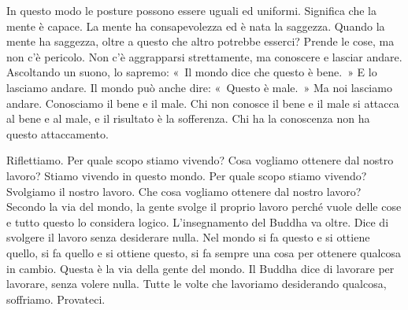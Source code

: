 In questo modo le posture possono essere uguali ed uniformi. Significa
che la mente è capace. La mente ha consapevolezza ed è nata la saggezza.
Quando la mente ha saggezza, oltre a questo che altro potrebbe esserci?
Prende le cose, ma non c'è pericolo. Non c'è aggrapparsi strettamente,
ma conoscere e lasciar andare. Ascoltando un suono, lo sapremo: «~Il
mondo dice che questo è bene.~» E lo lasciamo andare. Il mondo può anche
dire: «~Questo è male.~» Ma noi lasciamo andare. Conosciamo il bene e il
male. Chi non conosce il bene e il male si attacca al bene e al male, e
il risultato è la sofferenza. Chi ha la conoscenza non ha questo
attaccamento.

Riflettiamo. Per quale scopo stiamo vivendo? Cosa vogliamo ottenere dal
nostro lavoro? Stiamo vivendo in questo mondo. Per quale scopo stiamo
vivendo? Svolgiamo il nostro lavoro. Che cosa vogliamo ottenere dal
nostro lavoro? Secondo la via del mondo, la gente svolge il proprio
lavoro perché vuole delle cose e tutto questo lo considera logico.
L'insegnamento del Buddha va oltre. Dice di svolgere il lavoro senza
desiderare nulla. Nel mondo si fa questo e si ottiene quello, si fa
quello e si ottiene questo, si fa sempre una cosa per ottenere qualcosa
in cambio. Questa è la via della gente del mondo. Il Buddha dice di
lavorare per lavorare, senza volere nulla. Tutte le volte che lavoriamo
desiderando qualcosa, soffriamo. Provateci.

